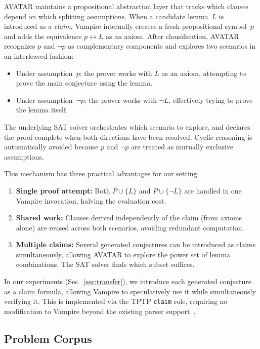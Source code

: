 \documentclass{easychair}
\newcommand{\Vampire}{Vampire\xspace}
\begin{document}
AVATAR maintains a propositional abstraction layer that tracks
which clauses depend on which splitting assumptions.  When a
candidate lemma~$L$ is introduced as a \emph{claim}, \Vampire
internally creates a fresh propositional symbol~$p$ and adds the
equivalence $p \leftrightarrow L$ as an axiom.  After clausification,
AVATAR recognizes $p$ and $\neg p$ as complementary components and
explores two scenarios in an interleaved fashion:
\begin{itemize}
\item Under assumption~$p$: the prover works with $L$ as an axiom,
  attempting to prove the main conjecture using the lemma.
\item Under assumption~$\neg p$: the prover works with $\neg L$,
  effectively trying to prove the lemma itself.
\end{itemize}
The underlying SAT solver orchestrates which scenario to explore,
and declares the proof complete when both directions have been
resolved.  Cyclic reasoning is automatically avoided because $p$
and $\neg p$ are treated as mutually exclusive assumptions.

This mechanism has three practical advantages for our setting:
\begin{enumerate}
\item \textbf{Single proof attempt:} Both $P \cup \{L\}$ and
  $P \cup \{\neg L\}$ are handled in one \Vampire invocation,
  halving the evaluation cost.
\item \textbf{Shared work:} Clauses derived independently of
  the claim (from axioms alone) are reused across both scenarios,
  avoiding redundant computation.
\item \textbf{Multiple claims:} Several generated conjectures can
  be introduced as claims simultaneously, allowing AVATAR to
  explore the power set of lemma combinations.  The SAT solver
  finds which subset suffices.
\end{enumerate}

In our experiments (Sec.~\ref{sec:transfer}), we introduce each
generated conjecture as a claim formula, allowing \Vampire to
speculatively use it while simultaneously verifying it.  This is
implemented via the TPTP \texttt{claim} role, requiring no
modification to \Vampire beyond the existing parser
support~\cite{Einarsdottir2024}.

\subsection{Problem Corpus}
\end{document}
